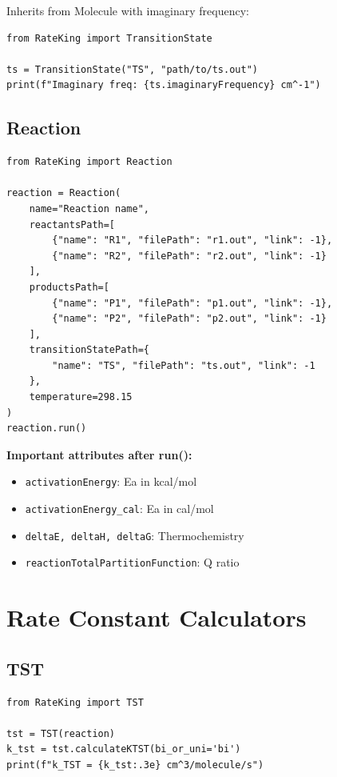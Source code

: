 \documentclass[11pt,a4paper]{book}
\begin{document}
Inherits from Molecule with imaginary frequency:

\begin{lstlisting}
from RateKing import TransitionState

ts = TransitionState("TS", "path/to/ts.out")
print(f"Imaginary freq: {ts.imaginaryFrequency} cm^-1")
\end{lstlisting}

\subsection{Reaction}

\begin{lstlisting}
from RateKing import Reaction

reaction = Reaction(
    name="Reaction name",
    reactantsPath=[
        {"name": "R1", "filePath": "r1.out", "link": -1},
        {"name": "R2", "filePath": "r2.out", "link": -1}
    ],
    productsPath=[
        {"name": "P1", "filePath": "p1.out", "link": -1},
        {"name": "P2", "filePath": "p2.out", "link": -1}
    ],
    transitionStatePath={
        "name": "TS", "filePath": "ts.out", "link": -1
    },
    temperature=298.15
)
reaction.run()
\end{lstlisting}

\textbf{Important attributes after run():}
\begin{itemize}
  \item \texttt{activationEnergy}: Ea in kcal/mol
  \item \texttt{activationEnergy\_cal}: Ea in cal/mol
  \item \texttt{deltaE, deltaH, deltaG}: Thermochemistry
  \item \texttt{reactionTotalPartitionFunction}: Q ratio
\end{itemize}

\section{Rate Constant Calculators}

\subsection{TST}

\begin{lstlisting}
from RateKing import TST

tst = TST(reaction)
k_tst = tst.calculateKTST(bi_or_uni='bi')
print(f"k_TST = {k_tst:.3e} cm^3/molecule/s")
\end{lstlisting}
\end{document}
